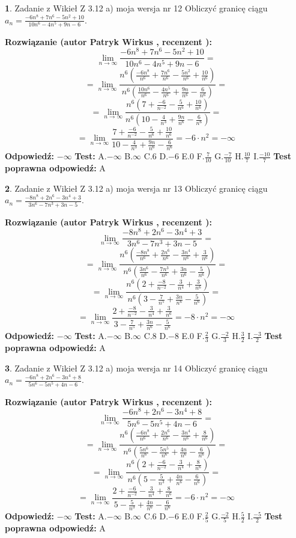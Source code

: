 \documentclass[12pt, a4paper]{article}
\theoremstyle{definition} %
\newtheorem{zad}{}
\newcommand{\zadStart}[1]{\begin{zad}#1\newline}
\newcommand{\zadStop}{\end{zad}}
\newcommand{\rozwStart}[2]{\noindent \textbf{Rozwiązanie (autor #1 , recenzent #2): }\newline}
\newcommand{\rozwStop}{\newline}
\newcommand{\odpStart}{\noindent \textbf{Odpowiedź:}\newline}
\newcommand{\odpStop}{\newline}
\newcommand{\testStart}{\noindent \textbf{Test:}\newline}
\newcommand{\testStop}{\newline}
\newcommand{\kluczStart}{\noindent \textbf{Test poprawna odpowiedź:}\newline}
\newcommand{\kluczStop}{\newline}
\begin{document}
\zadStart{Zadanie z Wikieł Z 3.12 a) moja wersja nr 12}
Obliczyć granicę ciągu $a_{n}=\frac{-6n^{8}+7n^{6}-5n^{2}+10}{10n^{6}-4n^{5}+9n-6}$.
\zadStop
\rozwStart{Patryk Wirkus}{}
$$\lim\limits_{n\to\infty}\frac{-6n^{8}+7n^{6}-5n^{2}+10}{10n^{6}-4n^{5}+9n-6}=$$
$$=\lim\limits_{n\to\infty}\frac{n^{6}\left(\frac{-6n^{8}}{n^{6}}+\frac{7n^{6}}{n^{6}}-\frac{5n^{2}}{n^{6}}+\frac{10}{n^{6}}\right)}{n^{6}\left(\frac{10n^{6}}{n^{6}}-\frac{4n^{5}}{n^{6}}+\frac{9n}{n^{6}}-\frac{6}{n^{6}}\right)}=$$
$$=\lim\limits_{n\to\infty}\frac{n^{6}\left(7+\frac{-6}{n^{-2}}-\frac{5}{n^{6}}+\frac{10}{n^{6}}\right)}
{n^{6}\left(10-\frac{4}{n^{3}}+\frac{9n}{n^{6}}-\frac{6}{n^{6}}\right)}=$$
$$=\lim\limits_{n\to\infty}\frac{7+\frac{-6}{n^{-2}}-\frac{5}{n^{6}}+\frac{10}{n^{6}}}{10-\frac{4}{n^{3}}+\frac{9n}{n^{6}}-\frac{6}{n^{6}}}=-6\cdot n^{2} = -\infty$$
\rozwStop
\odpStart
$-\infty$
\odpStop
\testStart
A.$-\infty$
B.$\infty$
C.$6$
D.$-6$
E.$0$
F.$\frac{7}{10}$
G.$\frac{-7}{10}$
H.$\frac{10}{7}$
I.$\frac{-10}{7}$
\testStop
\kluczStart
A
\kluczStop



\zadStart{Zadanie z Wikieł Z 3.12 a) moja wersja nr 13}
Obliczyć granicę ciągu $a_{n}=\frac{-8n^{8}+2n^{6}-3n^{4}+3}{3n^{6}-7n^{3}+3n-5}$.
\zadStop
\rozwStart{Patryk Wirkus}{}
$$\lim\limits_{n\to\infty}\frac{-8n^{8}+2n^{6}-3n^{4}+3}{3n^{6}-7n^{3}+3n-5}=$$
$$=\lim\limits_{n\to\infty}\frac{n^{6}\left(\frac{-8n^{8}}{n^{6}}+\frac{2n^{6}}{n^{6}}-\frac{3n^{4}}{n^{6}}+\frac{3}{n^{6}}\right)}{n^{6}\left(\frac{3n^{6}}{n^{6}}-\frac{7n^{3}}{n^{6}}+\frac{3n}{n^{6}}-\frac{5}{n^{6}}\right)}=$$
$$=\lim\limits_{n\to\infty}\frac{n^{6}\left(2+\frac{-8}{n^{-2}}-\frac{3}{n^{4}}+\frac{3}{n^{6}}\right)}
{n^{6}\left(3-\frac{7}{n^{5}}+\frac{3n}{n^{6}}-\frac{5}{n^{6}}\right)}=$$
$$=\lim\limits_{n\to\infty}\frac{2+\frac{-8}{n^{-2}}-\frac{3}{n^{4}}+\frac{3}{n^{6}}}{3-\frac{7}{n^{5}}+\frac{3n}{n^{6}}-\frac{5}{n^{6}}}=-8\cdot n^{2} = -\infty$$
\rozwStop
\odpStart
$-\infty$
\odpStop
\testStart
A.$-\infty$
B.$\infty$
C.$8$
D.$-8$
E.$0$
F.$\frac{2}{3}$
G.$\frac{-2}{3}$
H.$\frac{3}{2}$
I.$\frac{-3}{2}$
\testStop
\kluczStart
A
\kluczStop



\zadStart{Zadanie z Wikieł Z 3.12 a) moja wersja nr 14}
Obliczyć granicę ciągu $a_{n}=\frac{-6n^{8}+2n^{6}-3n^{4}+8}{5n^{6}-5n^{5}+4n-6}$.
\zadStop
\rozwStart{Patryk Wirkus}{}
$$\lim\limits_{n\to\infty}\frac{-6n^{8}+2n^{6}-3n^{4}+8}{5n^{6}-5n^{5}+4n-6}=$$
$$=\lim\limits_{n\to\infty}\frac{n^{6}\left(\frac{-6n^{8}}{n^{6}}+\frac{2n^{6}}{n^{6}}-\frac{3n^{4}}{n^{6}}+\frac{8}{n^{6}}\right)}{n^{6}\left(\frac{5n^{6}}{n^{6}}-\frac{5n^{5}}{n^{6}}+\frac{4n}{n^{6}}-\frac{6}{n^{6}}\right)}=$$
$$=\lim\limits_{n\to\infty}\frac{n^{6}\left(2+\frac{-6}{n^{-2}}-\frac{3}{n^{4}}+\frac{8}{n^{6}}\right)}
{n^{6}\left(5-\frac{5}{n^{3}}+\frac{4n}{n^{6}}-\frac{6}{n^{6}}\right)}=$$
$$=\lim\limits_{n\to\infty}\frac{2+\frac{-6}{n^{-2}}-\frac{3}{n^{4}}+\frac{8}{n^{6}}}{5-\frac{5}{n^{3}}+\frac{4n}{n^{6}}-\frac{6}{n^{6}}}=-6\cdot n^{2} = -\infty$$
\rozwStop
\odpStart
$-\infty$
\odpStop
\testStart
A.$-\infty$
B.$\infty$
C.$6$
D.$-6$
E.$0$
F.$\frac{2}{5}$
G.$\frac{-2}{5}$
H.$\frac{5}{2}$
I.$\frac{-5}{2}$
\testStop
\kluczStart
A
\kluczStop
\end{document}
